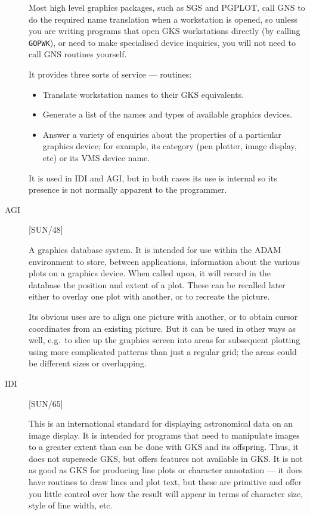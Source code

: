 \begin{description}
Most high level graphics packages, such as SGS and PGPLOT, call GNS to do the
required name translation when a workstation is opened, so unless you are
writing programs that open GKS workstations directly (by calling {\tt GOPWK}),
or need to make specialised device inquiries, you will not need to call
GNS routines yourself.

It provides three sorts of service --- routines:
\begin{itemize}
\item Translate workstation names to their GKS equivalents.
\item Generate a list of the names and types of available graphics devices.
\item Answer a variety of enquiries about the properties of a particular
graphics device; for example, its category (pen plotter, image display,
etc) or its VMS device name.
\end{itemize}
It is used in IDI and AGI, but in both cases its use is internal so its
presence is not normally apparent to the programmer.

\item [AGI] \hfill [SUN/48]

A graphics database system.
It is intended for use within the ADAM environment to store, between
applications, information about the various plots on a graphics device.
When called upon, it will record in the database the position and extent of a
plot.
These can be recalled later either to overlay one plot with another, or to
recreate the picture.

Its obvious uses are to align one picture with another, or to obtain cursor
coordinates from an existing picture.
But it can be used in other ways as well, e.g.\ to slice up the graphics
screen into areas for subsequent plotting using more complicated patterns than
just a regular grid; the areas could be different sizes or overlapping.

\item [IDI] \hfill [SUN/65]

This is an international standard for displaying astronomical data on an
image display.
It is intended for programs that need to manipulate images to a greater extent
than can be done with GKS and its offspring.
Thus, it does not supersede GKS, but offers features not available in GKS.
It is not as good as GKS for producing line plots or character annotation ---
it does have routines to draw lines and plot text, but these are primitive and
offer you little control over how the result will appear in terms of character
size, style of line width, etc.


\end{description}
